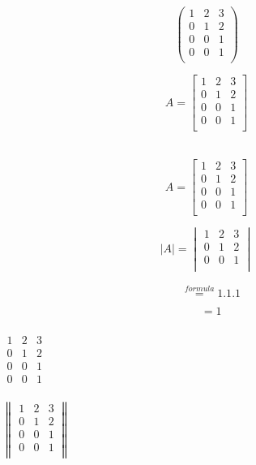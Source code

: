 \documentclass[12pt]{article}  %
\begin{document}
\[
\begin{pmatrix}
1 & 2 & 3 \\
0 & 1 & 2 \\
0 & 0 & 1 \\
0 & 0 & 1 \\
\end{pmatrix}
\]

\[
A=\begin{bmatrix}
    1 & 2 & 3 \\
	0 & 1 & 2 \\
	0 & 0 & 1 \\
	0 & 0 & 1 \\
	\end{bmatrix}
\]\\
\vspace{1in}
\begin{flushright}
\[
A=\begin{bmatrix}
    1 & 2 & 3 \\
	0 & 1 & 2 \\
	0 & 0 & 1 \\
	0 & 0 & 1 \\
	\end{bmatrix}
\]
\end{flushright}


\[
|A|=\begin{vmatrix}
		1 & 2 & 3 \\
		0 & 1 & 2 \\
		0 & 0 & 1 \\
		\end{vmatrix}
\]

\begin{align*}
&\overset{formula}{=} 1.1.1\\
\end{align*}   		
\begin{align*}
&=1\\
\end{align*}


$\begin{matrix}
1 & 2 & 3 \\
0 & 1 & 2 \\
0 & 0 & 1 \\
0 & 0 & 1 \\
\end{matrix}$

$
\begin{Vmatrix}
1 & 2 & 3 \\
0 & 1 & 2 \\
0 & 0 & 1 \\
0 & 0 & 1 \\
\end{Vmatrix}
$
\end{document}
